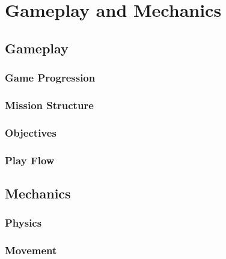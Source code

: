 
\section{Gameplay and Mechanics}

\subsection{Gameplay}

\subsubsection{Game Progression}

\subsubsection{Mission Structure}

\subsubsection{Objectives}

\subsubsection{Play Flow}

\subsection{Mechanics}

\subsubsection{Physics}

\subsubsection{Movement}



